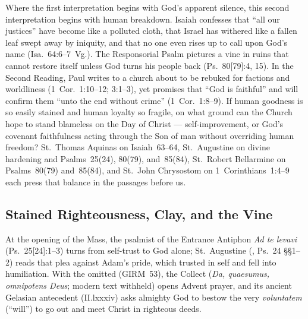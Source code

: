 
Where the first interpretation begins with God's apparent silence, this second interpretation begins with human breakdown. Isaiah confesses that ``all our justices'' have become like a polluted cloth, that Israel has withered like a fallen leaf swept away by iniquity, and that no one even rises up to call upon God's name (Isa.~64:6--7~Vg.). The Responsorial Psalm pictures a vine in ruins that cannot restore itself unless God turns his people back (Ps.~80[79]:4, 15). In the Second Reading, Paul writes to a church about to be rebuked for factions and worldliness (1~Cor.~1:10--12; 3:1--3), yet promises that ``God is faithful'' and will confirm them ``unto the end without crime'' (1~Cor.~1:8--9). If human goodness is so easily stained and human loyalty so fragile, on what ground can the Church hope to stand blameless on the Day of Christ --- self-improvement, or God's covenant faithfulness acting through the Son of man without overriding human freedom? St.~Thomas Aquinas on Isaiah~63--64, St.~Augustine on divine hardening and Psalms~25(24), 80(79), and~85(84), St.~Robert Bellarmine on Psalms~80(79) and~85(84), and St.~John Chrysostom on 1~Corinthians~1:4--9 each press that balance in the passages before us.

\subsection{Stained Righteousness, Clay, and the Vine}

At the opening of the Mass, the psalmist of the Entrance Antiphon \emph{Ad te levavi} (Ps.~25[24]:1--3) turns from self-trust to God alone; St.~Augustine (, Ps.~24 §§1--2) reads that plea against Adam's pride, which trusted in self and fell into humiliation. With the  omitted (GIRM~53), the Collect (\emph{Da, quaesumus, omnipotens Deus}; modern text withheld) opens Advent prayer, and its ancient Gelasian antecedent (II.lxxxiv) asks almighty God to bestow the very \emph{voluntatem} (``will'') to go out and meet Christ in righteous deeds.


